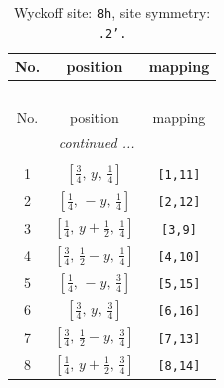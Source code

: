 \documentclass[fleqn,8pt]{jsarticle}
\begin{document}
\begin{longtable}{ccc}
\caption{Wyckoff site: {\tt 8h}, site symmetry: {\tt .2'.}}
 \\
 \hline \hline
No. & position & mapping \\ \hline \endfirsthead

\multicolumn{2}{l}{\tablename\ \thetable{}} \\
 \hline \hline
No. & position & mapping \\ \hline \endhead

 \hline \hline
\multicolumn{2}{r}{\footnotesize\it continued ...} \\ \endfoot

 \hline \hline
\multicolumn{2}{r}{} \\ \endlastfoot

1 & $\left[ \frac{3}{4},\, y,\, \frac{1}{4} \right]$ & {\tt [1,11]} \\ \hline
2 & $\left[ \frac{1}{4},\, - y,\, \frac{1}{4} \right]$ & {\tt [2,12]} \\ \hline
3 & $\left[ \frac{1}{4},\, y + \frac{1}{2},\, \frac{1}{4} \right]$ & {\tt [3,9]} \\ \hline
4 & $\left[ \frac{3}{4},\, \frac{1}{2} - y,\, \frac{1}{4} \right]$ & {\tt [4,10]} \\ \hline
5 & $\left[ \frac{1}{4},\, - y,\, \frac{3}{4} \right]$ & {\tt [5,15]} \\ \hline
6 & $\left[ \frac{3}{4},\, y,\, \frac{3}{4} \right]$ & {\tt [6,16]} \\ \hline
7 & $\left[ \frac{3}{4},\, \frac{1}{2} - y,\, \frac{3}{4} \right]$ & {\tt [7,13]} \\ \hline
8 & $\left[ \frac{1}{4},\, y + \frac{1}{2},\, \frac{3}{4} \right]$ & {\tt [8,14]} \\
\end{longtable}
\renewcommand{\arraystretch}{1.2}
\end{document}
